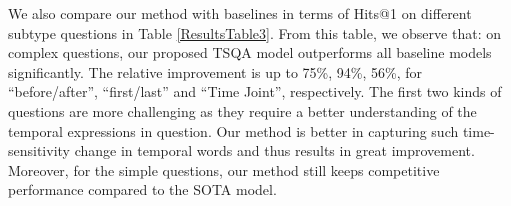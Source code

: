 \documentclass[11pt]{article}
\begin{document}
\begin{table}[!ht]
    \centering
    \small
    \caption{Comparison of different models w.r.t. question type in terms of Hits@1.}
    \label{ResultsTable3}
\end{table}

We also compare our method with baselines in terms of Hits@1 on different subtype questions in Table \ref{ResultsTable3}. From this table, we observe that: on complex questions, our proposed TSQA model outperforms all baseline models significantly. The relative improvement is up to 75\%, 94\%, 56\%, for ``before/after'', ``first/last'' and ``Time Joint'', respectively. The first two kinds of questions are more challenging as they require a better understanding of the temporal expressions in question. Our method is better in capturing such time-sensitivity change in temporal words and thus results in great improvement. Moreover, for the simple questions, our method still keeps competitive performance compared to the SOTA model.
\end{document}

